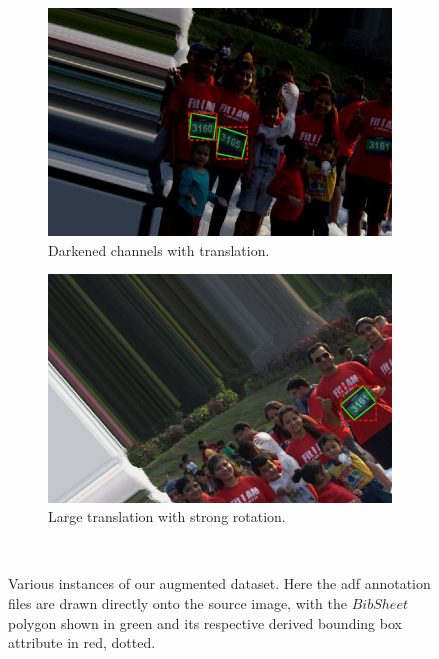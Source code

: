 \begin{figure}[h!]
  \hspace{\fill}
  \begin{subfigure}[b]{0.475\textwidth}
    \includegraphics[width=\textwidth]{images/dataset/augmentation/dark}
    \caption{Darkened channels with translation.}
    \label{fig:dataset:postprocessing:augmentation:crop1}
  \end{subfigure}
  \hspace{\fill}
  \begin{subfigure}[b]{0.475\textwidth}
    \includegraphics[width=\textwidth]{images/dataset/augmentation/large_offset_rot}
    \caption{Large translation with strong rotation.}
    \label{fig:dataset:postprocessing:augmentation:crop2}
  \end{subfigure}
  \hspace{\fill}
  \bigskip
  \\ 
  \caption[Various augmented images from our dataset]{Various instances of our augmented dataset. Here the \gls{adf} annotation files are drawn directly onto the source image, with the $BibSheet$ polygon shown in green and its respective derived bounding box attribute in red, dotted.}
  \label{fig:dataset:postprocessing:augmentation}
\end{figure}
